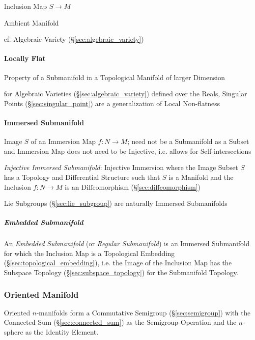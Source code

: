 Inclusion Map $S \rightarrow M$

Ambient Manifold

cf. Algebraic Variety (\S\ref{sec:algebraic_variety})



\paragraph{Locally Flat}\label{sec:locally_flat}\hfill

Property of a Submanifold in a Topological Manifold of larger Dimension

for Algebraic Varieties (\S\ref{sec:algebraic_variety}) defined over the Reals,
Singular Points (\S\ref{sec:singular_point}) are a generalization of Local
Non-flatness



\paragraph{Immersed Submanifold}\label{sec:immersed_submanifold}\hfill

Image $S$ of an Immersion Map $f : N \rightarrow M$; need not be a Submanifold
as a Subset and Immersion Map does not need to be Injective, i.e. allows for
Self-intersections

\emph{Injective Immersed Submanifold}: Injective Immersion where the Image
Subset $S$ has a Topology and Differential Structure such that $S$ is a
Manifold and the Inclusion $f : N \rightarrow M$ is an Diffeomorphism
(\S\ref{sec:diffeomorphism})

\fist Lie Subgroups (\S\ref{sec:lie_subgroup}) are naturally Immersed
Submanifolds



\subparagraph{Embedded Submanifold}\label{sec:embedded_submanifold}\hfill

An \emph{Embedded Submanifold} (or \emph{Regular Submanifold}) is an Immersed
Submanifold for which the Inclusion Map is a Topological Embedding
(\S\ref{sec:topological_embedding}), i.e. the Image of the Inclusion Map
has the Subspace Topology (\S\ref{sec:subspace_topology}) for the Submanifold
Topology.



\subsubsection{Oriented Manifold}\label{sec:oriented_manifold}

Oriented $n$-manifolds form a Commutative
Semigroup (\S\ref{sec:semigroup}) with the Connected Sum
(\S\ref{sec:connected_sum}) as the Semigroup Operation and the $n$-sphere as
the Identity Element.

